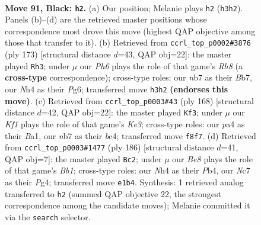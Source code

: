 \documentclass[11pt]{article}
\begin{document}
\clearpage

\begin{figure}[p]\centering
\begin{subfigure}{0.46\textwidth}\centering
\resizebox{\linewidth}{!}{%
\newchessgame
\chessboard[
  setfen={5k2/1Nn5/8/p7/P2pP2n/1P1B3p/4P3/2K1b3 b - - 49 91},
  showmover=false,
  pgfstyle=straightmove, color=movearrow, markmove={h3-h2}
]}
\caption{}
\end{subfigure}\hfill
\begin{subfigure}{0.46\textwidth}\centering
\resizebox{\linewidth}{!}{%
\newchessgame
\chessboard[
  setfen={3k4/1b6/p5p1/P2P1pP1/1PP2B2/8/3KB3/7r b - - 18 87},
  showmover=false,
  pgfstyle=straightmove, color=movearrow, markmove={h1-h3}
]}
\caption{}
\end{subfigure}
\\[4pt]
\begin{subfigure}{0.46\textwidth}\centering
\resizebox{\linewidth}{!}{%
\newchessgame
\chessboard[
  setfen={6k1/1B3p2/Pb4p1/2p1P2p/2b4P/4K1P1/8/B7 w - - 45 85},
  showmover=false,
  pgfstyle=straightmove, color=movearrow, markmove={e3-f3}
]}
\caption{}
\end{subfigure}\hfill
\begin{subfigure}{0.46\textwidth}\centering
\resizebox{\linewidth}{!}{%
\newchessgame
\chessboard[
  setfen={8/k7/3p1p2/3PbPp1/1P4P1/1K6/1p6/1B6 w - - 4 94},
  showmover=false,
  pgfstyle=straightmove, color=movearrow, markmove={b1-c2}
]}
\caption{}
\end{subfigure}
\caption{\textbf{Move 91, Black: \texttt{h2}.} (a) Our position; Melanie plays \texttt{h2} (\texttt{h3h2}). Panels (b)--(d) are the retrieved master positions whose correspondence most drove this move (highest QAP objective among those that transfer to it). (b) Retrieved from \texttt{ccrl\_top\_p0002\#3876} (ply 173) [structural distance $d$=43, QAP obj=22]: the master played \texttt{Rh3}; under $\mu$ our \emph{Ph6} plays the role of that game's \emph{Rh8} (a \textbf{cross-type} correspondence); cross-type roles: our \emph{n}b7 as their \emph{B}b7, our \emph{N}h4 as their \emph{P}g6; transferred move \texttt{h3h2} \textbf{(endorses this move)}. (c) Retrieved from \texttt{ccrl\_top\_p0003\#43} (ply 168) [structural distance $d$=42, QAP obj=22]: the master played \texttt{Kf3}; under $\mu$ our \emph{Kf1} plays the role of that game's \emph{Ke3}; cross-type roles: our \emph{p}a4 as their \emph{B}a1, our \emph{n}b7 as their \emph{b}c4; transferred move \texttt{f8f7}. (d) Retrieved from \texttt{ccrl\_top\_p0003\#1477} (ply 186) [structural distance $d$=41, QAP obj=7]: the master played \texttt{Bc2}; under $\mu$ our \emph{Be8} plays the role of that game's \emph{Bb1}; cross-type roles: our \emph{N}h4 as their \emph{P}b4, our \emph{N}c7 as their \emph{P}g4; transferred move \texttt{e1b4}. Synthesis: 1 retrieved analog transferred to \texttt{h2} (summed QAP objective 22, the strongest correspondence among the candidate moves); Melanie committed it via the \texttt{search} selector.}
\label{fig:thought-m181}
\end{figure}
\end{document}
